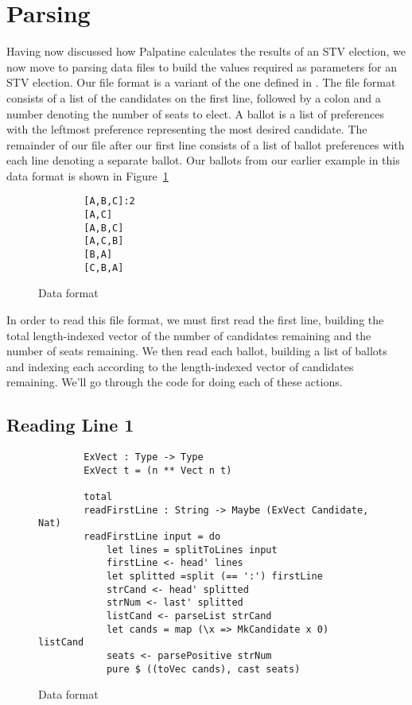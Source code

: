 \section{Parsing}

Having now discussed how Palpatine calculates the results of an STV election, we
now move to parsing data files to build the values required as parameters for an
STV election. Our file format is a variant of the one defined in
\cite{stv_haskell}. The file format consists of a list of the candidates on the
first line, followed by a colon and a number denoting the number of seats to
elect. A ballot is a list of preferences with the leftmost preference
representing the most desired candidate. The remainder of our file after our
first line consists of a list of ballot preferences with each line denoting a
separate ballot. Our ballots from our earlier example in this data format is
shown in Figure~\ref{stv_format}

\begin{figure}[ht!!!!!!!]
    \caption{Data format}
    \label{stv_format}
    \begin{lstlisting}
        [A,B,C]:2
        [A,C]
        [A,B,C]
        [A,C,B]
        [B,A]
        [C,B,A]
    \end{lstlisting}
\end{figure}

In order to read this file format, we must first read the first line, building
the total length-indexed vector of the number of candidates remaining and the
number of seats remaining. We then read each ballot, building a list of ballots
and indexing each according to the length-indexed vector of candidates
remaining. We'll go through the code for doing each of these actions. 

\subsection{Reading Line 1}

\begin{figure}[ht!!!!!!!]
    \caption{Data format}
    \label{read_first_line_code}
    \begin{lstlisting}
        ExVect : Type -> Type
        ExVect t = (n ** Vect n t)

        total
        readFirstLine : String -> Maybe (ExVect Candidate, Nat)
        readFirstLine input = do
            let lines = splitToLines input
            firstLine <- head' lines
            let splitted =split (== ':') firstLine
            strCand <- head' splitted
            strNum <- last' splitted
            listCand <- parseList strCand
            let cands = map (\x => MkCandidate x 0) listCand
            seats <- parsePositive strNum
            pure $ ((toVec cands), cast seats)
    \end{lstlisting}
\end{figure}

